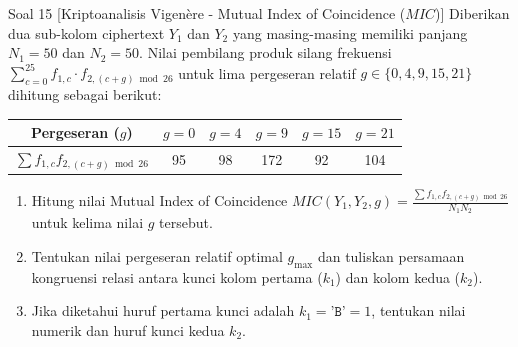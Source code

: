\documentclass[11pt,a4paper]{article}
\begin{document}

\begin{soalanalisis}{Soal 15 [Kriptoanalisis Vigenère - Mutual Index of Coincidence ($MIC$)]}
Diberikan dua sub-kolom ciphertext $Y_1$ dan $Y_2$ yang masing-masing memiliki panjang $N_1 = 50$ dan $N_2 = 50$.
Nilai pembilang produk silang frekuensi $\sum_{c=0}^{25} f_{1, c} \cdot f_{2, (c+g) \bmod 26}$ untuk lima pergeseran relatif $g \in \{0, 4, 9, 15, 21\}$ dihitung sebagai berikut:
\begin{center}
\begin{tabular}{c | c c c c c}
\toprule
\textbf{Pergeseran ($g$)} & $g = 0$ & $g = 4$ & $g = 9$ & $g = 15$ & $g = 21$ \\
\midrule
$\sum f_{1, c} f_{2, (c+g) \bmod 26}$ & 95 & 98 & 172 & 92 & 104 \\
\bottomrule
\end{tabular}
\end{center}
\begin{enumerate}[label=(\alph*)]
    \item Hitung nilai Mutual Index of Coincidence $MIC(Y_1, Y_2, g) = \frac{\sum f_{1, c} f_{2, (c+g) \bmod 26}}{N_1 N_2}$ untuk kelima nilai $g$ tersebut.
    \item Tentukan nilai pergeseran relatif optimal $g_{\max}$ dan tuliskan persamaan kongruensi relasi antara kunci kolom pertama ($k_1$) dan kolom kedua ($k_2$).
    \item Jika diketahui huruf pertama kunci adalah $k_1 = \texttt{'B'} = 1$, tentukan nilai numerik dan huruf kunci kedua $k_2$.
\end{enumerate}
\end{soalanalisis}
\end{document}
